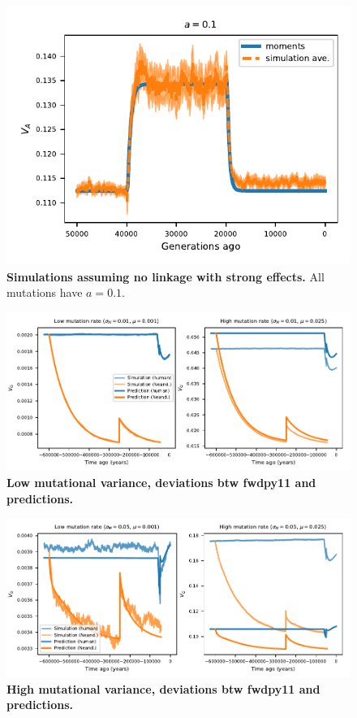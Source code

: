 \documentclass[]{article}
\begin{document}
\begin{figure}[ht!]
    \centering
    \includegraphics{../figures/one_pop.a_0.1.pdf}
    \caption{
        \textbf{Simulations assuming no linkage with strong effects.}
        All mutations have $a=0.1$.
    }
    \label{fig:one-popC}
\end{figure}

\begin{figure}[ht!]
    \centering
    \includegraphics{../figures/model_comparison.SD_0.01.mu_0.001_0.025.pdf}
    \caption{
        \textbf{Low mutational variance, deviations btw fwdpy11 and predictions.}
    }
    \label{fig:low_VM}
\end{figure}

\begin{figure}[ht!]
    \centering 
    \includegraphics{../figures/model_comparison.SD_0.05.mu_0.001_0.025.pdf}
    \caption{
        \textbf{High mutational variance, deviations btw fwdpy11 and predictions.}
    }
    \label{fig:high_VM}
\end{figure}
\end{document}
